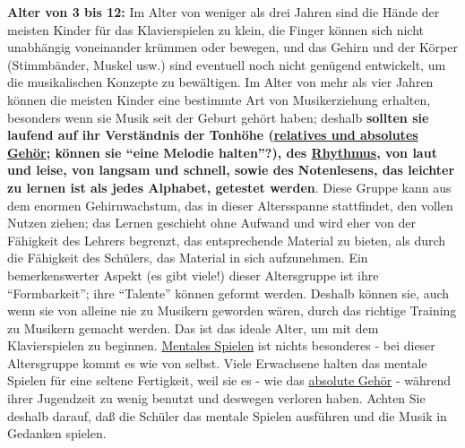 \textbf{Alter von 3 bis 12:} Im Alter von weniger als drei Jahren sind die Hände der meisten Kinder für das Klavierspielen zu klein, die Finger können sich nicht unabhängig voneinander krümmen oder bewegen, und das Gehirn und der Körper (Stimmbänder, Muskel usw.) sind eventuell noch nicht genügend entwickelt, um die musikalischen Konzepte zu bewältigen.
Im Alter von mehr als vier Jahren können die meisten Kinder eine bestimmte Art von Musikerziehung erhalten, besonders wenn sie Musik seit der Geburt gehört haben; deshalb \textbf{sollten sie laufend auf ihr Verständnis der Tonhöhe (\hyperlink{c1iii12}{relatives und absolutes Gehör}; können sie \enquote{eine Melodie halten}?), des \hyperlink{c1iii1b}{Rhythmus}, von laut und leise, von langsam  und schnell, sowie des Notenlesens, das leichter zu lernen ist als jedes Alphabet, getestet werden}.
Diese Gruppe kann aus dem enormen Gehirnwachstum, das in dieser Altersspanne stattfindet, den vollen Nutzen ziehen;
das Lernen geschieht ohne Aufwand und wird eher von der Fähigkeit des Lehrers begrenzt, das entsprechende Material zu bieten, als durch die Fähigkeit des Schülers, das Material in sich aufzunehmen.
Ein bemerkenswerter Aspekt (es gibt viele!) dieser Altersgruppe ist ihre \enquote{Formbarkeit}; ihre \enquote{Talente} können geformt werden.
Deshalb können sie, auch wenn sie von alleine nie zu Musikern geworden wären, durch das richtige Training zu Musikern gemacht werden.
Das ist das ideale Alter, um mit dem Klavierspielen zu beginnen.
\hyperlink{c1ii12mental}{Mentales Spielen} ist nichts besonderes - bei dieser Altersgruppe kommt es wie von selbst.
Viele Erwachsene halten das mentale Spielen für eine seltene Fertigkeit, weil sie es - wie das \hyperlink{c1iii12}{absolute Gehör} - während ihrer Jugendzeit zu wenig benutzt und deswegen verloren haben.
Achten Sie deshalb darauf, daß die Schüler das mentale Spielen ausführen und die Musik in Gedanken spielen.


\hypertarget{c1iii18c13}{}

